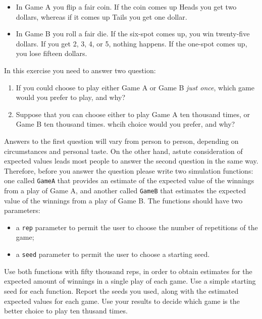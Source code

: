 \documentclass[]{book}
\providecommand{\tightlist}{%
  \setlength{\itemsep}{0pt}\setlength{\parskip}{0pt}}
\theoremstyle{definition}
\theoremstyle{definition}
\theoremstyle{definition}
\theoremstyle{remark}
\begin{document}
{\begin{enumerate}
  \begin{itemize}
  \tightlist
  \item
    In Game A you flip a fair coin. If the coin comes up Heads you get
    two dollars, whereas if it comes up Tails you get one dollar.
  \item
    In Game B you roll a fair die. If the six-spot comes up, you win
    twenty-five dollars. If you get 2, 3, 4, or 5, nothing happens. If
    the one-spot comes up, you lose fifteen dollars.
  \end{itemize}

  In this exercise you need to answer two question:

  \begin{enumerate}
  \def\labelenumii{\arabic{enumii}.}
  \tightlist
  \item
    If you could choose to play either Game A or Game B \emph{just
    once}, which game would you prefer to play, and why?
  \item
    Suppose that you can choose either to play Game A ten thousand
    times, or Game B ten thousand times. whcih choice would you prefer,
    and why?
  \end{enumerate}

  Answers to the first question will vary from person to person,
  depending on circumstances and personal taste. On the other hand,
  astute consideration of expected values leads most people to answer
  the second question in the same way. Therefore, before you answer the
  question please write two simulation functions: one called
  \texttt{GameA} that provides an estimate of the expected value of the
  winnings from a play of Game A, and another called \texttt{GameB} that
  estimates the expected value of the winnings from a play of Game B.
  The functions should have two parameters:

  \begin{itemize}
  \tightlist
  \item
    a \texttt{rep} parameter to permit the user to choose the number of
    repetitions of the game;
  \item
    a \texttt{seed} parameter to permit the user to choose a starting
    seed.
  \end{itemize}

  Use both functions with fifty thousand reps, in order to obtain
  estimates for the expected amount of winnings in a single play of each
  game. Use a simple starting seed for each function. Report the seeds
  you used, along with the estimated expected values for each game. Use
  your results to decide which game is the better choice to play ten
  thusand times.


\end{enumerate}}
\end{document}

